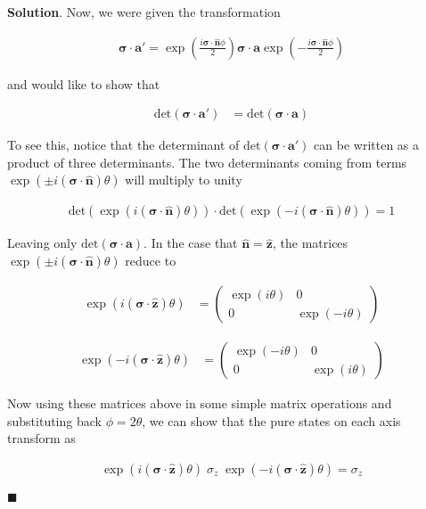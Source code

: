 \documentclass[12pt]{article}
\theoremstyle{definition}
\newenvironment{s}{%
        \begin{trivlist} \item \textbf{Solution}. }{%
            \hspace*{\fill} $\blacksquare$\end{trivlist}}%
\begin{document}
{\begin{s}
Now, we were given the transformation

\begin{align*}
\bm{\sigma}\cdot \bm{a}' = \exp\left(\frac{i\bm{\sigma}\cdot\bm{\hat{n}}\phi}{2}\right)\bm{\sigma}\cdot \bm{a} \exp\left(-\frac{i\bm{\sigma}\cdot\bm{\hat{n}}\phi}{2}\right)
\end{align*}

and would like to show that

\begin{align*}
\mathrm{det}(\bm{\sigma}\cdot \bm{a}' ) &= \mathrm{det}(\bm{\sigma}\cdot \bm{a} )
\end{align*}

To see this, notice that the determinant of $\mathrm{det}(\bm{\sigma}\cdot \bm{a}')$ can be written as a product of three determinants. The two determinants coming from terms $\exp(\pm i(\bm{\sigma}\cdot\bm{\hat{n}})\theta)$ will multiply to unity 

\begin{align*}
\mathrm{det}(\exp(i(\bm{\sigma}\cdot\bm{\hat{n}})\theta)) \cdot \mathrm{det}(\exp(- i(\bm{\sigma}\cdot\bm{\hat{n}})\theta)) = 1
\end{align*}

Leaving only $\mathrm{det}(\bm{\sigma}\cdot \bm{a} )$. In the case that $\mathbf{\hat{n}} = \mathbf{\hat{z}}$, the matrices $\exp(\pm i(\bm{\sigma}\cdot\bm{\hat{n}})\theta)$  reduce to 

\begin{align*}
\exp(i(\bm{\sigma}\cdot\bm{\hat{z}})\theta) &=
\begin{pmatrix}
\exp(i\theta) & 0\\
0 & \exp(-i\theta)
\end{pmatrix}
\end{align*}

\begin{align*}
\exp(-i(\bm{\sigma}\cdot\bm{\hat{z}})\theta) &=
\begin{pmatrix}
\exp(-i\theta) & 0\\
0 & \exp(i\theta)
\end{pmatrix}
\end{align*}

Now using these matrices above in some simple matrix operations and substituting back $\phi = 2\theta$, we can show that the pure states on each axis transform as

\begin{align*}
\exp(i(\bm{\sigma}\cdot\bm{\hat{z}})\theta) \; \sigma_{z}\;\exp(-i(\bm{\sigma}\cdot\bm{\hat{z}})\theta) = \sigma_{z}
\end{align*}


\end{s}}
\end{document}

